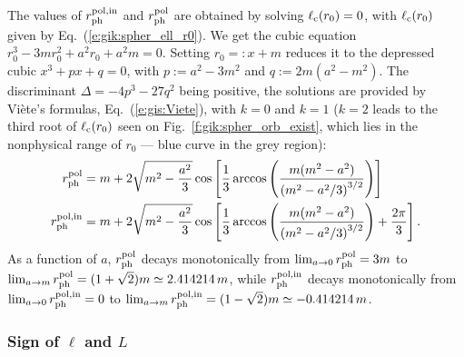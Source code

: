 The values of $r_{\rm ph}^{\rm pol,in}$ and
$r_{\rm ph}^{\rm pol}$ are obtained by solving $\ell_{\rm c}(r_0) = 0$,
with $\ell_{\rm c}(r_0)$ given by Eq.~(\ref{e:gik:spher_ell_r0}). We get the cubic
equation $r_0^3 - 3 m r_0^2 + a^2 r_0 + a^2 m = 0$. Setting $r_0 =: x + m$ reduces
it to the depressed cubic $x^3 + p x + q = 0$, with $p := a^2 - 3 m^2$
and $q := 2m (a^2 - m^2)$. The discriminant $\mathit{\Delta} = - 4 p^3 - 27 q^2$
being positive, the solutions are provided by Viète's formulas, Eq.~(\ref{e:gis:Viete}),
with $k=0$ and $k=1$ ($k=2$ leads to the third root of $\ell_{\rm c}(r_0)$ seen on
Fig.~\ref{f:gik:spher_orb_exist}, which lies
in the nonphysical range of $r_0$ --- blue curve in the grey region):
\begin{subequations}
\begin{align}
    r_{\rm ph}^{\rm pol} & = m + 2 \sqrt{m^2 - \frac{a^2}{3}}
        \cos\left[ \frac{1}{3}\arccos \left(
        \frac{m(m^2 - a^2)}{\left( m^2 - {a^2}/{3} \right) ^{3/2}} \right) \right]
        \label{e:gik:rph_pol} \\
    r_{\rm ph}^{\rm pol,in} & = m + 2 \sqrt{m^2 - \frac{a^2}{3}}
        \cos\left[ \frac{1}{3}\arccos \left(
        \frac{m(m^2 - a^2)}{\left( m^2 - {a^2}/{3} \right) ^{3/2}} \right) + \frac{2\pi}{3} \right] .
\end{align}
\end{subequations}
As a function of $a$, $r_{\rm ph}^{\rm pol}$ decays monotonically from
$\lim_{a\to 0} r_{\rm ph}^{\rm pol} = 3 m$ to
$\lim_{a\to m} r_{\rm ph}^{\rm pol} = ( 1 + \sqrt{2}) m \simeq 2.414214\, m$,
while $r_{\rm ph}^{\rm pol,in}$ decays monotonically from
$\lim_{a\to 0} r_{\rm ph}^{\rm pol,in} = 0$ to
$\lim_{a\to m} r_{\rm ph}^{\rm pol,in} = (1 - \sqrt{2}) m \simeq -0.414214\, m$.

\subsubsection{Sign of $\ell$ and $L$}

